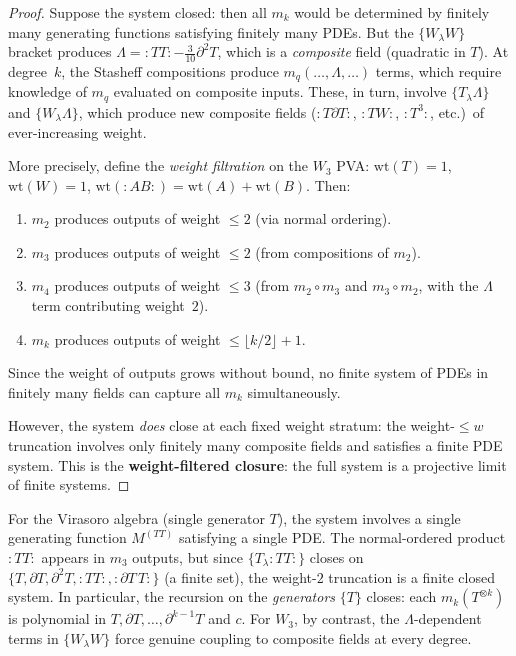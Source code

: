 \begin{proof}
Suppose the system closed: then all $m_k$ would be determined by
finitely many generating functions satisfying finitely many PDEs. But
the $\{W_\lambda W\}$ bracket produces $\Lambda = {:}TT{:} -
\tfrac{3}{10}\partial^2 T$, which is a \emph{composite} field (quadratic
in $T$). At degree~$k$, the Stasheff compositions produce
$m_q(\ldots, \Lambda, \ldots)$ terms, which require knowledge of
$m_q$ evaluated on composite inputs. These, in turn, involve
$\{T_\lambda \Lambda\}$ and $\{W_\lambda \Lambda\}$, which produce
new composite fields ($:T\partial T:$, $:TW:$, $:T^3:$, etc.)\ of
ever-increasing weight.

More precisely, define the \emph{weight filtration} on the $W_3$ PVA:
$\mathrm{wt}(T) = 1$, $\mathrm{wt}(W) = 1$, $\mathrm{wt}(:AB:) =
\mathrm{wt}(A) + \mathrm{wt}(B)$. Then:
\begin{enumerate}
\item $m_2$ produces outputs of weight $\le 2$ (via normal ordering).
\item $m_3$ produces outputs of weight $\le 2$ (from compositions of $m_2$).
\item $m_4$ produces outputs of weight $\le 3$ (from $m_2 \circ m_3$
 and $m_3 \circ m_2$, with the $\Lambda$ term contributing weight~$2$).
\item $m_k$ produces outputs of weight $\le \lfloor k/2 \rfloor + 1$.
\end{enumerate}

Since the weight of outputs grows without bound, no finite system of
PDEs in finitely many fields can capture all $m_k$ simultaneously.

However, the system \emph{does} close at each fixed weight stratum:
the weight-$\le w$ truncation involves only finitely many composite
fields and satisfies a finite PDE system. This is the
\textbf{weight-filtered closure}: the full system is a projective limit
of finite systems.
\end{proof}

\begin{remark}
\label{rem:virasoro-closure}
For the Virasoro algebra (single generator $T$), the system involves
a single generating function $M^{(TT)}$ satisfying a single PDE\@.
The normal-ordered product $:TT:$ appears in $m_3$ outputs, but
since $\{T_\lambda :TT:\}$ closes on $\{T, \partial T, \partial^2 T,
:TT:, :\partial T\, T:\}$ (a finite set), the weight-$2$ truncation
is a finite closed system. In particular, the recursion on the
\emph{generators} $\{T\}$ closes: each $m_k(T^{\otimes k})$ is
polynomial in $T, \partial T, \ldots, \partial^{k-1} T$ and $c$.
For $W_3$, by contrast, the $\Lambda$-dependent terms in $\{W_\lambda W\}$
force genuine coupling to composite fields at every degree.
\end{remark}

